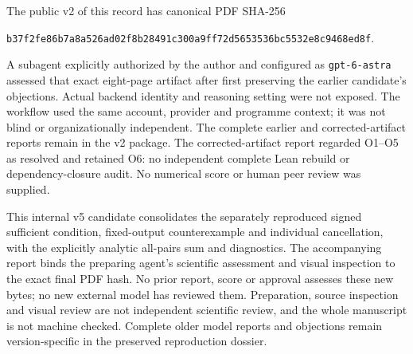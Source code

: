 \documentclass[11pt]{article}
\begin{document}
The public v2 of this record has canonical PDF SHA-256
\begin{center}\small\texttt{b37f2fe86b7a8a526ad02f8b28491c300a9ff72d5653536bc5532e8c9468ed8f}.\end{center}
A subagent explicitly authorized by the author and configured as
\texttt{gpt-6-astra} assessed that exact eight-page artifact after first
preserving the earlier candidate's objections. Actual backend identity and
reasoning setting were not exposed. The workflow used the same account,
provider and programme context; it was not blind or organizationally
independent. The complete earlier and corrected-artifact reports remain in
the v2 package. The corrected-artifact report regarded O1--O5 as resolved
and retained O6: no independent complete Lean rebuild or dependency-closure
audit. No numerical score or human peer review was supplied.

This internal v5 candidate consolidates the separately reproduced signed
sufficient condition, fixed-output counterexample and individual cancellation,
with the explicitly analytic all-pairs sum and diagnostics. The accompanying
report binds the preparing agent's scientific assessment and visual inspection
to the exact final PDF hash. No prior report, score or approval assesses these
new bytes; no new external model has reviewed them. Preparation, source
inspection and visual review are not independent scientific review, and the
whole manuscript is not machine checked. Complete older model reports and
objections remain version-specific in the preserved reproduction dossier.
\end{document}
